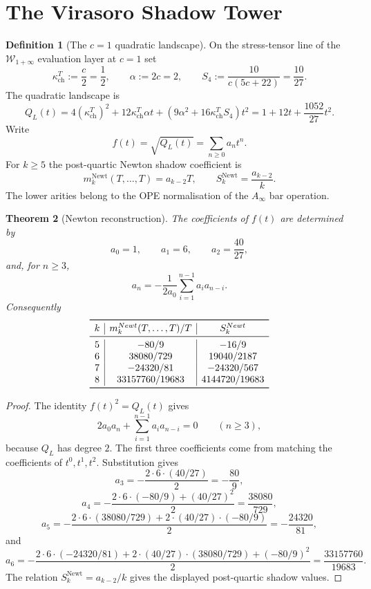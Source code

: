 \documentclass[11pt]{article}
\newtheorem{theorem}{Theorem}[section]
\theoremstyle{definition}
\newtheorem{definition}[theorem]{Definition}
\theoremstyle{remark}
\newcommand{\Winf}{\mathcal{W}_{1+\infty}}
\newcommand{\kch}{\kappa_{\mathrm{ch}}}
\begin{document}
\section{The Virasoro Shadow Tower}
\label{sec:virasoro-shadow}

\begin{definition}[The $c=1$ quadratic landscape]
\label{def:quadratic-landscape}
On the stress-tensor line of the $\Winf$ evaluation layer at $c=1$ set
\[
  \kch^{T}:=\frac{c}{2}=\frac12,\qquad
  \alpha:=2c=2,\qquad
  S_4:=\frac{10}{c(5c+22)}=\frac{10}{27}.
\]
The quadratic landscape is
\[
  Q_L(t)
  =
  4(\kch^{T})^2+12\kch^{T}\alpha t
  +(9\alpha^2+16\kch^{T}S_4)t^2
  =
  1+12t+\frac{1052}{27}t^2.
\]
Write
\[
  f(t)=\sqrt{Q_L(t)}=\sum_{n\geq0}a_nt^n.
\]
For $k\geq5$ the post-quartic Newton shadow coefficient is
\[
  m_k^{\mathrm{Newt}}(T,\ldots,T)=a_{k-2}T,\qquad
  S_k^{\mathrm{Newt}}=\frac{a_{k-2}}{k}.
\]
The lower arities belong to the OPE normalisation of the $A_\infty$ bar
operation.
\end{definition}

\begin{theorem}[Newton reconstruction]
\label{thm:newton-shadow}
The coefficients of $f(t)$ are determined by
\[
  a_0=1,\qquad a_1=6,\qquad a_2=\frac{40}{27},
\]
and, for $n\geq3$,
\[
  a_n=-\frac{1}{2a_0}\sum_{i=1}^{n-1}a_ia_{n-i}.
\]
Consequently
\[
\begin{array}{c|c|c}
\toprule
k & m_k^{\mathrm{Newt}}(T,\ldots,T)/T & S_k^{\mathrm{Newt}}\\
\midrule
5 & -80/9 & -16/9\\
6 & 38080/729 & 19040/2187\\
7 & -24320/81 & -24320/567\\
8 & 33157760/19683 & 4144720/19683\\
\bottomrule
\end{array}
\]
\end{theorem}

\begin{proof}
The identity $f(t)^2=Q_L(t)$ gives
\[
  2a_0a_n+\sum_{i=1}^{n-1}a_ia_{n-i}=0
  \qquad(n\geq3),
\]
because $Q_L$ has degree $2$. The first three coefficients come from
matching the coefficients of $t^0,t^1,t^2$. Substitution gives
\[
  a_3=-\frac{2\cdot6\cdot(40/27)}{2}=-\frac{80}{9},
\]
\[
  a_4=-\frac{2\cdot6\cdot(-80/9)+(40/27)^2}{2}
      =\frac{38080}{729},
\]
\[
  a_5=-\frac{2\cdot6\cdot(38080/729)
        +2\cdot(40/27)\cdot(-80/9)}{2}
      =-\frac{24320}{81},
\]
and
\[
  a_6=-\frac{2\cdot6\cdot(-24320/81)
        +2\cdot(40/27)\cdot(38080/729)
        +(-80/9)^2}{2}
      =\frac{33157760}{19683}.
\]
The relation $S_k^{\mathrm{Newt}}=a_{k-2}/k$ gives the displayed
post-quartic shadow values.
\end{proof}
\end{document}
